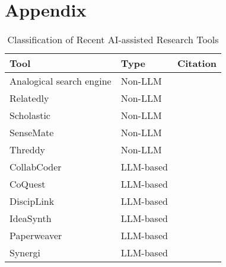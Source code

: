 \section{Appendix}
\begin{table}[h!]
  \centering
  \small
  \begin{tabular}{l l l}
    \toprule
    \textbf{Tool} & \textbf{Type} & \textbf{Citation} \\
    \midrule
    Analogical search engine & Non-LLM & \cite{AnalogicalSearchEngine} \\
    Relatedly               & Non-LLM & \cite{Relatedly} \\
    Scholastic              & Non-LLM & \cite{scholastic} \\
    SenseMate               & Non-LLM & \cite{sensemate} \\
    Threddy                 & Non-LLM & \cite{threddy} \\
    \midrule
    CollabCoder             & LLM-based & \cite{CollabCoder} \\
    CoQuest                 & LLM-based & \cite{CoQuest} \\
    DiscipLink              & LLM-based & \cite{disciplink} \\
    IdeaSynth               & LLM-based & \cite{IdeaSynth} \\
    Paperweaver             & LLM-based & \cite{paperweaver} \\
    Synergi                 & LLM-based & \cite{synergi} \\
    \bottomrule
  \end{tabular}
  \caption{Classification of Recent AI-assisted Research Tools}
  \label{tab:tool_classification}
\end{table} 


